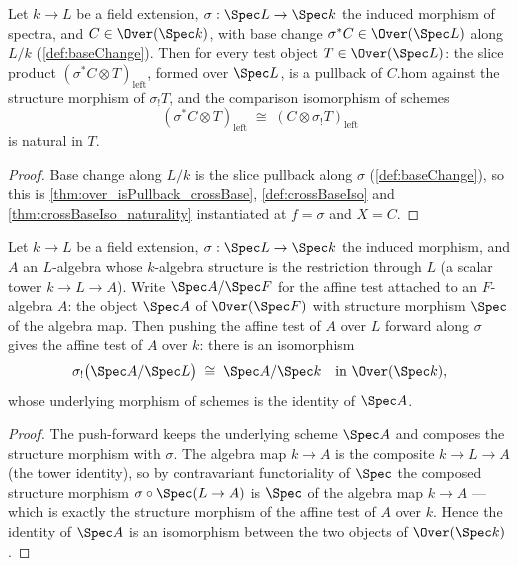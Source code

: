 \begin{theorem}
  \label{thm:crossBase_baseChange}
  \leanok
  Let \(k \to L\) be a field extension, \(\sigma : \Spec L \to \Spec k\) the induced
  morphism of spectra, and \(C \in \Over(\Spec k)\), with base change
  \(\sigma^{*}C \in \Over(\Spec L)\) along \(L/k\) (\ref{def:baseChange}). Then for
  every test object \(T \in \Over(\Spec L)\): the slice product
  \((\sigma^{*}C \otimes T)_{\mathrm{left}}\), formed over \(\Spec L\), is a pullback
  of \(C.\mathrm{hom}\) against the structure morphism of \(\sigma_{!}T\), and the
  comparison isomorphism of schemes
  \[
    (\sigma^{*}C \otimes T)_{\mathrm{left}} \;\cong\;
      (C \otimes \sigma_{!}T)_{\mathrm{left}}
  \]
  is natural in \(T\).
\end{theorem}
\begin{proof}
  \leanok
  Base change along \(L/k\) is the slice pullback along \(\sigma\)
  (\ref{def:baseChange}), so this is \ref{thm:over_isPullback_crossBase},
  \ref{def:crossBaseIso} and \ref{thm:crossBaseIso_naturality} instantiated at
  \(f = \sigma\) and \(X = C\).
\end{proof}

\begin{definition}
  \label{def:mapOverSpecIso}
  \leanok
  Let \(k \to L\) be a field extension, \(\sigma : \Spec L \to \Spec k\) the induced
  morphism, and \(A\) an \(L\)-algebra whose \(k\)-algebra structure is the restriction
  through \(L\) (a scalar tower \(k \to L \to A\)). Write \(\Spec A / \Spec F\) for the
  affine test attached to an \(F\)-algebra \(A\): the object \(\Spec A\) of
  \(\Over(\Spec F)\) with structure morphism \(\Spec\) of the algebra map. Then pushing
  the affine test of \(A\) over \(L\) forward along \(\sigma\) gives the affine test of
  \(A\) over \(k\): there is an isomorphism
  \[
    \sigma_{!}\bigl(\Spec A / \Spec L\bigr) \;\cong\; \Spec A / \Spec k
    \quad \text{in } \Over(\Spec k),
  \]
  whose underlying morphism of schemes is the identity of \(\Spec A\).
\end{definition}
\begin{proof}
  \leanok
  The push-forward keeps the underlying scheme \(\Spec A\) and composes the structure
  morphism with \(\sigma\). The algebra map \(k \to A\) is the composite
  \(k \to L \to A\) (the tower identity), so by contravariant functoriality of
  \(\Spec\) the composed structure morphism
  \(\sigma \circ \Spec(L \to A)\) is \(\Spec\) of the algebra map \(k \to A\) --- which
  is exactly the structure morphism of the affine test of \(A\) over \(k\). Hence the
  identity of \(\Spec A\) is an isomorphism between the two objects of
  \(\Over(\Spec k)\).
\end{proof}

